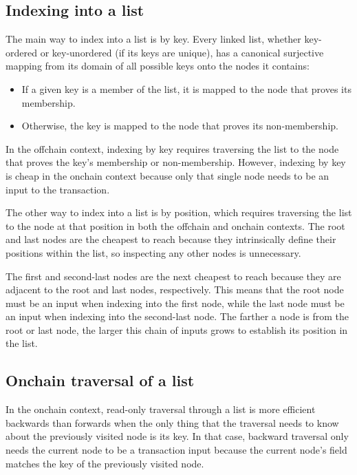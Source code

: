 \documentclass[../midgard.tex]{subfiles}
\begin{document}
\subsection{Indexing into a list}
\label{h:indexing-into-a-list}

The main way to index into a list is by key.
Every linked list, whether key-ordered or key-unordered (if its keys are unique), has a canonical surjective mapping from its domain of all possible keys onto the nodes it contains:
\begin{itemize}
    \item If a given key is a member of the list, it is mapped to the node that proves its membership.
    \item Otherwise, the key is mapped to the node that proves its non-membership.
\end{itemize}

In the offchain context, indexing by key requires traversing the list to the node that proves the key's membership or non-membership.
However, indexing by key is cheap in the onchain context because only that single node needs to be an input to the transaction.

The other way to index into a list is by position, which requires traversing the list to the node at that position in both the offchain and onchain contexts.
The root and last nodes are the cheapest to reach because they intrinsically define their positions within the list, so inspecting any other nodes is unnecessary.

The first and second-last nodes are the next cheapest to reach because they are adjacent to the root and last nodes, respectively.
This means that the root node must be an input when indexing into the first node, while the last node must be an input when indexing into the second-last node.
The farther a node is from the root or last node, the larger this chain of inputs grows to establish its position in the list.

\subsection{Onchain traversal of a list}
\label{h:onchain-traversal-list}

In the onchain context, read-only traversal through a list is more efficient backwards than forwards when the only thing that the traversal needs to know about the previously visited node is its key.
In that case, backward traversal only needs the current node to be a transaction input because the current node's  field matches the key of the previously visited node.
\end{document}
